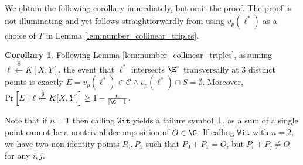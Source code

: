 \documentclass[11pt,letterpaper]{article}
\theoremstyle{definition}
\newtheorem{corollary}[theorem]{Corollary}
\newcommand{\6}{\mathbf}
\newcommand{\7}{\mathcal}
\newcommand{\lsamp}{\xleftarrow{\$}}
\begin{document}
We obtain the following corollary immediately, but omit the proof. The proof is not illuminating and yet follows straightforwardly from using $v_p(\ell^*)$ as a choice of $T$ in Lemma \ref{lem:number_collinear_triples}.

\begin{corollary}
\label{cor:prob_collinear_triples}
Following Lemma \ref{lem:number_collinear_triples}, assuming $\ell \lsamp K[X,Y]$, the event that $\ell^*$ intersects $\E^*$ transversally at $3$ distinct points is exactly $E = v_p(\ell^*) \in \mathcal{C} \wedge v_p(\ell^*) \cap S = \emptyset$. Moreover, $\text{Pr}\left[E \mid \ell \lsamp K[X,Y]\right] \geq 1-\frac{n}{\left|\G\right|-1}$.
\end{corollary}

Note that if $n=1$ then calling $\texttt{Wit}$ yields a failure symbol $\bot$, as a sum of a single point cannot be a nontrivial decomposition of $O \in \G$. If calling $\texttt{Wit}$ with $n = 2$, we have two non-identity points $P_0, P_1$ such that $P_0 + P_1 = O$, but $P_i + P_j \neq O$ for any $i,j$.
\end{document}
